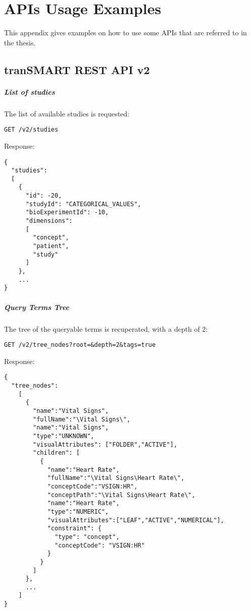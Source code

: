 \chapter{APIs Usage Examples}

This appendix gives examples on how to use some APIs that are referred to in the thesis.

\section{tranSMART REST API v2}

\paragraph{List of studies}
The list of available studies is requested:
\begin{verbatim}
GET /v2/studies
\end{verbatim}

Response:
\begin{verbatim}
{
  "studies": 
  [
    {
      "id": -20,
      "studyId": "CATEGORICAL_VALUES",
      "bioExperimentId": -10,
      "dimensions": 
      [
        "concept",
        "patient",
        "study"
      ]
    },
    ...
}
\end{verbatim}

\paragraph{Query Terms Tree}
The tree of the queryable terms is recuperated, with a depth of 2:
\begin{verbatim}
GET /v2/tree_nodes?root=&depth=2&tags=true
\end{verbatim}

Response:
\begin{verbatim}
{
  "tree_nodes":
    [
      {
        "name":"Vital Signs",
        "fullName":"\Vital Signs\",
        "name":"Vital Signs",
        "type":"UNKNOWN",
        "visualAttributes": ["FOLDER","ACTIVE"], 
        "children": [
          {
            "name":"Heart Rate",
            "fullName":"\Vital Signs\Heart Rate\",
            "conceptCode":"VSIGN:HR",
            "conceptPath":"\Vital Signs\Heart Rate\",
            "name":"Heart Rate",
            "type":"NUMERIC",
            "visualAttributes":["LEAF","ACTIVE","NUMERICAL"],
            "constraint": {
              "type": "concept",
              "conceptCode": "VSIGN:HR"
            }
          }
        ]
      },
      ...
    ]
}
\end{verbatim}

